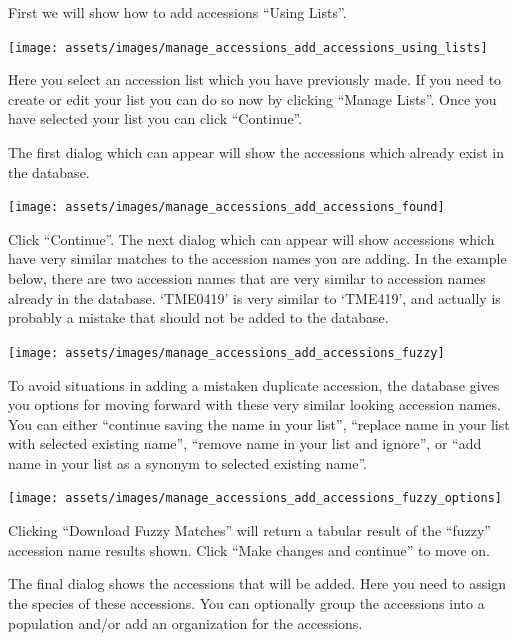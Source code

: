 \documentclass[
  12pt,
]{book}
\begin{document}
First we will show how to add accessions ``Using Lists''.

\begin{center}\texttt{[image: assets/images/manage\_accessions\_add\_accessions\_using\_lists]} \end{center}

Here you select an accession list which you have previously made. If you need to create or edit your list you can do so now by clicking ``Manage Lists''. Once you have selected your list you can click ``Continue''.

The first dialog which can appear will show the accessions which already exist in the database.

\begin{center}\texttt{[image: assets/images/manage\_accessions\_add\_accessions\_found]} \end{center}

Click ``Continue''. The next dialog which can appear will show accessions which have very similar matches to the accession names you are adding. In the example below, there are two accession names that are very similar to accession names already in the database. `TME0419' is very similar to `TME419', and actually is probably a mistake that should not be added to the database.

\begin{center}\texttt{[image: assets/images/manage\_accessions\_add\_accessions\_fuzzy]} \end{center}

To avoid situations in adding a mistaken duplicate accession, the database gives you options for moving forward with these very similar looking accession names. You can either ``continue saving the name in your list'', ``replace name in your list with selected existing name'', ``remove name in your list and ignore'', or ``add name in your list as a synonym to selected existing name''.

\begin{center}\texttt{[image: assets/images/manage\_accessions\_add\_accessions\_fuzzy\_options]} \end{center}

Clicking ``Download Fuzzy Matches'' will return a tabular result of the ``fuzzy'' accession name results shown. Click ``Make changes and continue'' to move on.

The final dialog shows the accessions that will be added. Here you need to assign the species of these accessions. You can optionally group the accessions into a population and/or add an organization for the accessions.
\end{document}
